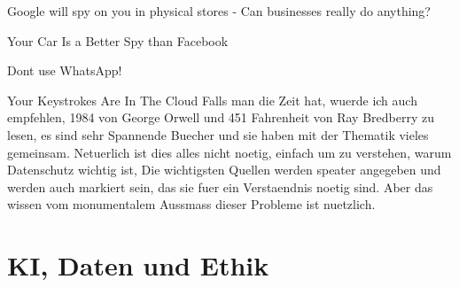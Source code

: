 \documentclass{report}
\begin{document}
Google will spy on you in physical stores - Can businesses really do anything? \citep{offline-tracking-google}

Your Car Is a Better Spy than Facebook \citep{car-better-spy-than-facebook}

Dont use WhatsApp!\citep{dont-use-whatsapp}

Your Keystrokes Are In The Cloud \citep{you-keystrokes-are-in-the-cloud}
\newline
Falls man die Zeit hat, wuerde ich auch empfehlen, 1984 von George Orwell und 451 Fahrenheit von Ray Bredberry zu lesen, es sind sehr Spannende Buecher und sie haben mit der Thematik vieles gemeinsam.
Netuerlich ist dies alles nicht noetig, einfach um zu verstehen, warum Datenschutz wichtig ist, Die wichtigsten Quellen werden speater angegeben und werden auch markiert sein, das sie fuer ein Verstaendnis noetig sind. Aber das wissen vom monumentalem Aussmass dieser Probleme ist nuetzlich. 
\chapter{KI, Daten und Ethik}
\end{document}
